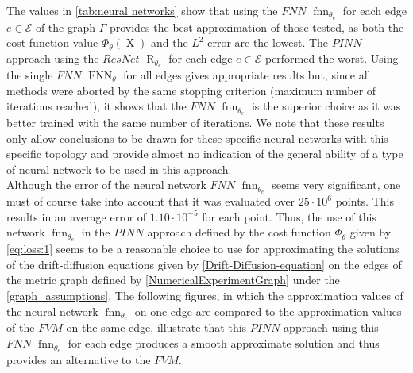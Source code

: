 \begin{table}[H]
    \caption{The values of the cost function $\Phi_{\theta} \left( \operatorname{X} \right)$ and the $L^2$-Error with respect to the values generated by the $FVM$ method of the three different neural networks after the learning phase.}
    \label{tab:neural networks}
\end{table}

The values in \cref{tab:neural networks} show that using the $FNN$ $\operatorname{fnn}_{\theta_e}$ for each edge $e \in \mathcal{E}$ of the graph $\Gamma$ provides the best approximation of those tested, as both the cost function value $\Phi_{\theta} \left( \operatorname{X} \right)$ and the $L^2$-error are the lowest. The $PINN$ approach using the $ResNet$ $\operatorname{R}_{\theta_e}$ for each edge $e \in \mathcal{E}$ performed the worst. Using the single $FNN$ $\operatorname{FNN}_{\theta}$ for all edges gives appropriate results but, since all methods were aborted by the same stopping criterion (maximum number of iterations reached), it shows that the $FNN$ $\operatorname{fnn}_{\theta_e}$ is the superior choice as it was better trained with the same number of iterations. We note that these results only allow conclusions to be drawn for these specific neural networks with this specific topology and provide almost no indication of the general ability of a type of neural network to be used in this approach.  \\
Although the error of the neural network $FNN$ $\operatorname{fnn}_{\theta_e}$ seems very significant, one must of course take into account that it was evaluated over $25 \cdot 10^{6}$ points. This results in an average error of $1.10 \cdot 10^{-5}$ for each point. Thus, the use of this network $\operatorname{fnn}_{\theta_e}$ in the $PINN$ approach defined by the cost function $\Phi_{\theta}$ given by \cref{eq:loss:1} seems to be a reasonable choice to use for approximating the solutions of the drift-diffusion equations given by \cref{Drift-Diffusion-equation} on the edges of the metric graph defined by \cref{NumericalExperimentGraph} under the \cref{graph_assumptions}. The following figures, in which the approximation values of the neural network $\operatorname{fnn}_{\theta_e}$ on one edge are compared to the approximation values of the $FVM$ on the same edge, illustrate that this $PINN$ approach using this $FNN$ $\operatorname{fnn}_{\theta_e}$ for each edge produces a smooth approximate solution and thus provides an alternative to the $FVM$. \\

